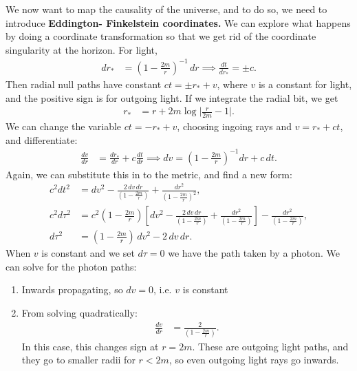 \documentclass[a4paper, 11pt, normalem]{report}
\begin{document}
We now want to map the causality of the universe, and to do so, we need to introduce \textbf{Eddington- Finkelstein coordinates.}
We can explore what happens by doing a coordinate transformation so that we get rid of the coordinate singularity at the horizon. 
For light, 
\begin{align}
    dr_{*} &= \left(1-\frac{2m}{r}\right)^{-1}\,dr \implies \frac{dt}{dr_{*}} = \pm c.
\end{align}
Then radial null paths have constant $ct=\pm r_* + v$, where $v$ is a constant for light, and the positive sign is for outgoing light. 
If we integrate the radial bit, we get
\begin{align}
    r_{*} &= r + 2m\log\bigg|\frac{r}{2m}-1\bigg|.
\end{align}
We can change the variable $ct=-r_* + v$, choosing ingoing rays and $v=r_*+ct$, and differentiate:
\begin{align}
    \frac{dv}{dr} &= \frac{dr_{*}}{dr} + c\frac{dt}{dr} \implies dv = \left(1-\frac{2m}{r}\right)^{-1}dr + c\,dt.
\end{align}
Again, we can substitute this in to the metric, and find a new form:
\begin{align}
    c^2dt^2 &= dv^2 - \frac{2\,dv\,dr}{\left(1-\frac{2m}{r}\right)} + \frac{dr^2}{\left(1-\frac{2m}{r}\right)^2}, \\
    c^2d\tau^2 &= c^2\left(1-\frac{2m}{r}\right)\left[dv^2-\frac{2\,dv\,dr}{\left(1-\frac{2m}{r}\right)} + \frac{dr^2}{\left(1-\frac{2m}{r}\right)}\right] - \frac{dr^2}{\left(1-\frac{2m}{r}\right)},\\
    d\tau^2 &= \left(1-\frac{2m}{r}\right)\,dv^2 - 2\,dv\,dr.
\end{align}
When $v$ is constant and we set $d\tau=0$ we have the path taken by a photon.
We can solve for the photon paths:
\begin{enumerate}
    \item Inwards propagating, so $dv = 0$, i.e. $v$ is constant
    \item From solving quadratically:
        \begin{align}
            \frac{dv}{dr} &= \frac{2}{\left(1-\frac{2m}{r}\right)}.
        \end{align}
        In this case, this changes sign at $r=2m$. 
        These are outgoing light paths, and they go to smaller radii for $r<2m$, so even outgoing light rays go inwards. 
\end{enumerate}
\end{document}
